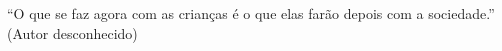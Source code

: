 \begin{epigrafe}
    \vspace*{\fill}
{%
	\noindent\hspace{.5\textwidth}
	{\begin{minipage}{.5\textwidth}
		\begin{flushright}
			``O que se faz agora com as crianças é o que elas farão depois com a sociedade.'' \\ (Autor desconhecido)%
		\end{flushright}
	\end{minipage}}%
	\vspace*{3cm}
}%
\end{epigrafe}
